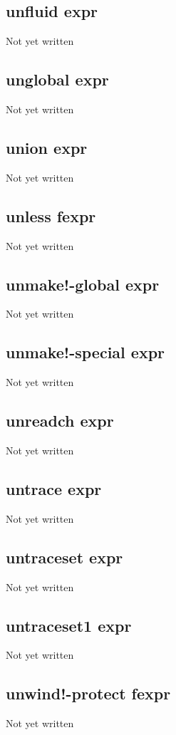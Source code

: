 \documentclass[a4paper,11pt]{article}
\begin{document}
\subsection{\ttfamily unfluid expr}
Not yet written

\subsection{\ttfamily unglobal expr}
Not yet written

\subsection{\ttfamily union expr}
Not yet written

\subsection{\ttfamily unless fexpr}
Not yet written

\subsection{\ttfamily unmake!-global expr}
Not yet written

\subsection{\ttfamily unmake!-special expr}
Not yet written

\subsection{\ttfamily unreadch expr}
Not yet written

\subsection{\ttfamily untrace expr}
Not yet written

\subsection{\ttfamily untraceset expr}
Not yet written

\subsection{\ttfamily untraceset1 expr}
Not yet written

\subsection{\ttfamily unwind!-protect fexpr}
Not yet written
\end{document}
